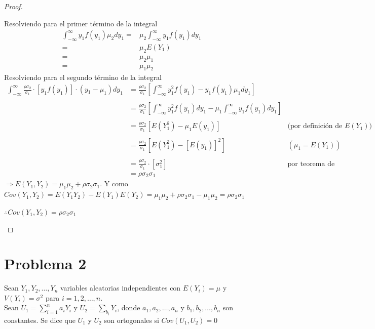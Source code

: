 \documentclass[a4paper,12pt]{article}
\begin{document}
\begin{proof}
\begin{center}
    \end{center}
    Resolviendo para el primer término de la integral
    \[
    \begin{array}{rl}
         \int_{-\infty}^{\infty}y_1f(y_1)\mu_2 dy_1= & \mu_2 \int_{-\infty}^{\infty}y_1f(y_1) dy_1  \\
         = & \mu_2 E(Y_1)\\
         = & \mu_2\mu_1\\
         =& \mu_1\mu_2
    \end{array}
    \]
    Resolviendo para el segundo término de la integral
    \[
    \begin{array}{rll}
          \displaystyle\int_{-\infty}^{\infty}\displaystyle\frac{\rho\sigma_2}{\sigma_1}\cdot[y_1f(y_1)]\cdot(y{_1}-\mu_1) dy_1 &=\displaystyle \frac{\rho\sigma_2}{\sigma_1} \left [ \int_{-\infty}^{\infty} y_1^2f(y_1) - y_1f(y_1)\mu_1 dy_1 \right] \\\\
         & = \displaystyle \frac{\rho\sigma_2}{\sigma_1} \left [ \int_{-\infty}^{\infty} y_1^2f(y_1)dy_1 - \mu_1\int_{-\infty}^{\infty} y_1f(y_1) dy_1\right]\\\\
         & = \displaystyle \frac{\rho\sigma_2}{\sigma_1} \left [ E(Y_1^2) - \mu_1E(y_1) \right] & \text{(por definición de $E(Y_1)$)}\\\\
         & = \displaystyle \frac{\rho\sigma_2}{\sigma_1} \left [ E(Y_1^2) - [E(y_1)]^2 \right] & (\mu_1 = E(Y_1))\\\\
         & = \displaystyle \frac{\rho\sigma_2}{\sigma_1}\cdot [\sigma_1^2] & \text{por teorema de varianza}\\
         &= \rho\sigma_2\sigma_1
    \end{array}
    \]
    $\Rightarrow E(Y_1,Y_2) = \mu_1\mu_2 + \rho\sigma_2\sigma_1$. Y como $Cov(Y_1,Y_2) = E(Y_1Y_2) - E(Y_1)E(Y_2) = \mu_1\mu_2 + \rho\sigma_2\sigma_1 - \mu_1 \mu_2 = \rho\sigma_2\sigma_1 $
    \begin{center}
        $\therefore Cov(Y_1,Y_2) =\rho\sigma_2\sigma_1$
    \end{center}
\end{proof}

\section{Problema 2}
Sean $Y_1, Y_2, \dots, Y_n$ variables aleatorias independientes con $E(Y_i) = \mu$ y $V(Y_i) = \sigma^2$ para $i = 1, 2, \dots, n$.\\
Sean $U_1 = \sum_{i = 1}^n a_iY_i$ y $U_2 = \sum_{b_i}Y_i$, donde $a_1,a_2,\dots, a_n$ y $b_1,b_2,\dots,b_n$ son constantes. Se dice que $U_1$ y $U_2$ son ortogonales si $Cov(U_1,U_2) = 0$
\end{document}
